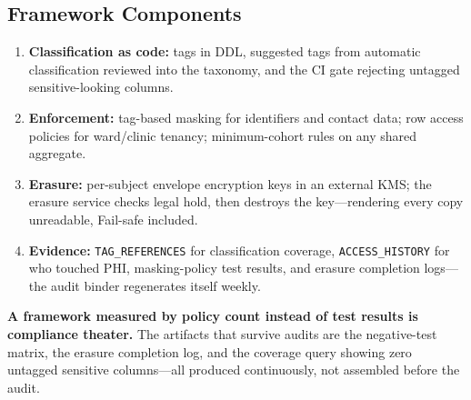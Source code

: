 \subsection{Framework Components}
\begin{enumerate}
    \item \textbf{Classification as code:} tags in DDL, suggested tags from automatic classification reviewed into the taxonomy, and the CI gate rejecting untagged sensitive-looking columns.
    \item \textbf{Enforcement:} tag-based masking for identifiers and contact data; row access policies for ward/clinic tenancy; minimum-cohort rules on any shared aggregate.
    \item \textbf{Erasure:} per-subject envelope encryption keys in an external KMS; the erasure service checks legal hold, then destroys the key---rendering every copy unreadable, Fail-safe included.
    \item \textbf{Evidence:} \texttt{TAG\_REFERENCES} for classification coverage, \texttt{ACCESS\_HISTORY} for who touched PHI, masking-policy test results, and erasure completion logs---the audit binder regenerates itself weekly.
\end{enumerate}

\begin{pitfall}
\textbf{A framework measured by policy count instead of test results is compliance theater.} The artifacts that survive audits are the negative-test matrix, the erasure completion log, and the coverage query showing zero untagged sensitive columns---all produced continuously, not assembled before the audit.
\end{pitfall}

